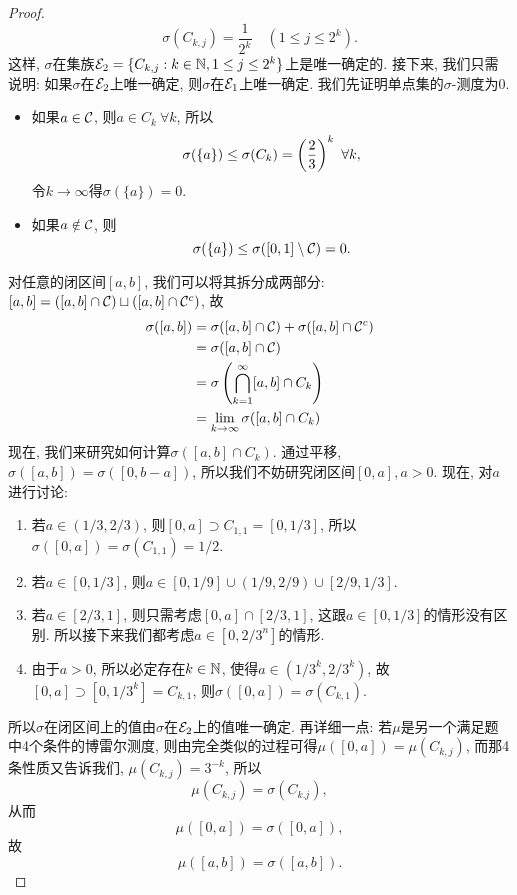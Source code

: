 \begin{proof}
    $$\sigma(C_{k,j}) = \frac{1}{2^k} \quad (1 \leq j \leq 2^k). $$
    这样, $\sigma$在集族$\mathcal{E}_2 = \{C_{k,j}: k \in \mathbb{N}, 1 \leq j \leq 2^k \}$上是唯一确定的.
    接下来, 我们只需说明: 如果$\sigma$在$\mathcal{E}_2$上唯一确定, 则$\sigma$在$\mathcal{E}_1$上唯一确定.
    我们先证明单点集的$\sigma$-测度为$0$. 
    \begin{itemize}
        \item 如果$a \in \mathcal{C}$, 则$a \in C_k~\forall k$, 所以
        $$\sigma(\{a\}) \leq \sigma(C_k) = \left(\frac{2}{3}\right)^k ~\forall k, $$
        令$k \to \infty$得$\sigma(\{a\}) = 0$.
        \item 如果$a \notin \mathcal{C}$, 则$$\sigma(\{a\}) \leq \sigma([0,1] \setminus \mathcal{C}) = 0. $$ 
    \end{itemize}
    
    
    对任意的闭区间$[a,b]$, 我们可以将其拆分成两部分:
    $[a,b] = ([a,b] \cap \mathcal{C}) \sqcup ([a,b] \cap \mathcal{C}^c)$, 故
    \begin{align*}
        \sigma([a,b])
        &= \sigma([a,b] \cap \mathcal{C}) + \sigma([a,b] \cap \mathcal{C}^c) \\
        &= \sigma([a,b] \cap \mathcal{C}) \\
        &= \sigma\left(\bigcap_{k=1}^{\infty}[a,b] \cap C_k \right) \\
        &= \lim_{k \to \infty} \sigma([a,b] \cap C_k)
    \end{align*}
    现在, 我们来研究如何计算$\sigma([a,b] \cap C_k)$. 
    通过平移, $\sigma([a,b]) = \sigma([0, b-a])$, 
    所以我们不妨研究闭区间$[0,a], a > 0$.
    现在, 对$a$进行讨论:
    \begin{enumerate}
        \item 若$a \in (1/3, 2/3)$, 则$[0,a] \supset C_{1,1} = [0, 1/3]$, 所以$\sigma([0,a])=\sigma(C_{1,1}) = 1/2$. 
        \item 若$a \in [0, 1/3]$, 则$a \in [0, 1/9] \cup (1/9, 2/9) \cup [2/9, 1/3]$.
        \item 若$a \in [2/3, 1]$, 则只需考虑$[0, a] \cap [2/3, 1]$, 这跟$a \in [0, 1/3]$的情形没有区别. 所以接下来我们都考虑$a \in [0, 2/3^n]$的情形. 
        \item 由于$a>0$, 所以必定存在$k \in \mathbb{N}$, 使得$a \in (1/3^k, 2/3^k)$, 故$[0,a] \supset [0, 1/3^k] = C_{k, 1}$, 则$\sigma([0,a]) = \sigma(C_{k,1})$. 
        
    \end{enumerate}
    所以$\sigma$在闭区间上的值由$\sigma$在$\mathcal{E}_2$上的值唯一确定. 再详细一点: 若$\mu$是另一个满足题中4个条件的博雷尔测度, 则由完全类似的过程可得$\mu([0,a]) = \mu(C_{k,j})$, 而那4条性质又告诉我们, $\mu(C_{k,j}) = 3^{-k}$, 所以
    $$\mu(C_{k,j}) = \sigma(C_{k.j}), $$ 从而$$\mu([0,a]) = \sigma([0,a]), $$
    故$$\mu([a,b]) = \sigma([a,b]). $$
    

\end{proof}
